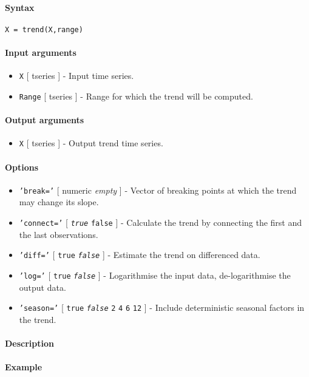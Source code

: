 


	\paragraph{Syntax}\label{syntax}

\begin{verbatim}
X = trend(X,range)
\end{verbatim}

\paragraph{Input arguments}\label{input-arguments}

\begin{itemize}
\item
  \texttt{X} {[} tseries {]} - Input time series.
\item
  \texttt{Range} {[} tseries {]} - Range for which the trend will be
  computed.
\end{itemize}

\paragraph{Output arguments}\label{output-arguments}

\begin{itemize}
\itemsep1pt\parskip0pt
\item
  \texttt{X} {[} tseries {]} - Output trend time series.
\end{itemize}

\paragraph{Options}\label{options}

\begin{itemize}
\item
  \texttt{'break='} {[} numeric \textbar{} \emph{empty} {]} - Vector of
  breaking points at which the trend may change its slope.
\item
  \texttt{'connect='} {[} \emph{\texttt{true}} \textbar{} \texttt{false}
  {]} - Calculate the trend by connecting the first and the last
  observations.
\item
  \texttt{'diff='} {[} \texttt{true} \textbar{} \emph{\texttt{false}}
  {]} - Estimate the trend on differenced data.
\item
  \texttt{'log='} {[} \texttt{true} \textbar{} \emph{\texttt{false}} {]}
  - Logarithmise the input data, de-logarithmise the output data.
\item
  \texttt{'season='} {[} \texttt{true} \textbar{} \emph{\texttt{false}}
  \textbar{} \texttt{2} \textbar{} \texttt{4} \textbar{} \texttt{6}
  \textbar{} \texttt{12} {]} - Include deterministic seasonal factors in
  the trend.
\end{itemize}

\paragraph{Description}\label{description}

\paragraph{Example}\label{example}


